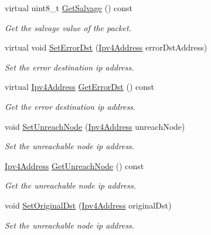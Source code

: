 \begin{DoxyCompactItemize}
virtual uint8\+\_\+t \hyperlink{classns3_1_1dsr_1_1DsrOptionRerrUnreachHeader_accb89e9b2908de0a0fcd4db3a0ec2246}{Get\+Salvage} () const 
\begin{DoxyCompactList}\small\item\em Get the salvage value of the packet. \end{DoxyCompactList}\item 
virtual void \hyperlink{classns3_1_1dsr_1_1DsrOptionRerrUnreachHeader_a6d4c996ae8b40494c715ff64261aa317}{Set\+Error\+Dst} (\hyperlink{classns3_1_1Ipv4Address}{Ipv4\+Address} error\+Dst\+Address)
\begin{DoxyCompactList}\small\item\em Set the error destination ip address. \end{DoxyCompactList}\item 
virtual \hyperlink{classns3_1_1Ipv4Address}{Ipv4\+Address} \hyperlink{classns3_1_1dsr_1_1DsrOptionRerrUnreachHeader_ad52af57129fd6d28969a2a1f256b5cd5}{Get\+Error\+Dst} () const 
\begin{DoxyCompactList}\small\item\em Get the error destination ip address. \end{DoxyCompactList}\item 
void \hyperlink{classns3_1_1dsr_1_1DsrOptionRerrUnreachHeader_a6cf82ac792fab829e8a04fb87ec339d4}{Set\+Unreach\+Node} (\hyperlink{classns3_1_1Ipv4Address}{Ipv4\+Address} unreach\+Node)
\begin{DoxyCompactList}\small\item\em Set the unreachable node ip address. \end{DoxyCompactList}\item 
\hyperlink{classns3_1_1Ipv4Address}{Ipv4\+Address} \hyperlink{classns3_1_1dsr_1_1DsrOptionRerrUnreachHeader_a25398f4ae81b699369559c861404e0b9}{Get\+Unreach\+Node} () const 
\begin{DoxyCompactList}\small\item\em Get the unreachable node ip address. \end{DoxyCompactList}\item 
void \hyperlink{classns3_1_1dsr_1_1DsrOptionRerrUnreachHeader_a09fa3ef4d6f4d7b9cf4226e3cad034ca}{Set\+Original\+Dst} (\hyperlink{classns3_1_1Ipv4Address}{Ipv4\+Address} original\+Dst)
\begin{DoxyCompactList}\small\item\em Set the unreachable node ip address. \end{DoxyCompactList}\item 

\end{DoxyCompactItemize}

